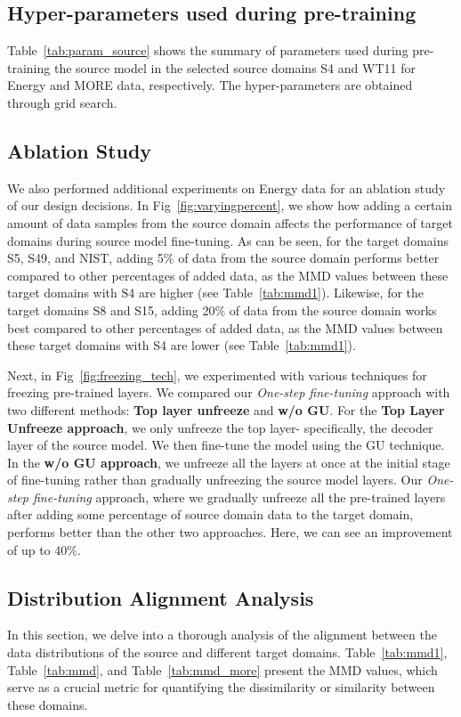 \documentclass[letterpaper]{article} %
\begin{document}
\subsection{Hyper-parameters used during pre-training}
Table~\ref{tab:param_source} shows the summary of parameters used during pre-training the source model in the selected source domains S4 and WT11 for Energy and MORE data, respectively. The hyper-parameters are obtained through grid search.

\subsection{Ablation Study}\label{ablation}
We also performed additional experiments on Energy data for an ablation study of our design decisions. In Fig~\ref{fig:varyingpercent}, we show how adding a certain amount of data samples from the source domain affects the performance of target domains during source model fine-tuning. As can be seen, for the target domains S5, S49, and NIST, adding 5\% of data from the source domain performs better compared to other percentages of added data, as the MMD values between these target domains with S4 are higher (see Table~\ref{tab:mmd1}). Likewise, for the target domains S8 and S15, adding 20\% of data from the source domain works best compared to other percentages of added data, as the MMD values between these target domains with S4 are lower (see Table~\ref{tab:mmd1}).

Next, in Fig~\ref{fig:freezing_tech}, we experimented with various techniques for freezing pre-trained layers. We compared our \emph{One-step fine-tuning} approach with two different methods: \textbf{Top layer unfreeze} and \textbf{w/o GU}. For the \textbf{Top Layer Unfreeze approach}, we only unfreeze the top layer- specifically, the decoder layer of the source model. We then fine-tune the model using the GU technique. In the \textbf{w/o GU approach}, we unfreeze all the layers at once at the initial stage of fine-tuning rather than gradually unfreezing the source model layers. Our \emph{One-step fine-tuning} approach, where we gradually unfreeze all the pre-trained layers after adding some percentage of source domain data to the target domain, performs better than the other two approaches. Here, we can see an improvement of up to 40\%.

\subsection{Distribution Alignment Analysis}
In this section, we delve into a thorough analysis of the alignment between the data distributions of the source and different target domains. Table~\ref{tab:mmd1}, Table~\ref{tab:mmd}, and Table~\ref{tab:mmd_more} present the MMD values, which serve as a crucial metric for quantifying the dissimilarity or similarity between these domains.
\end{document}
